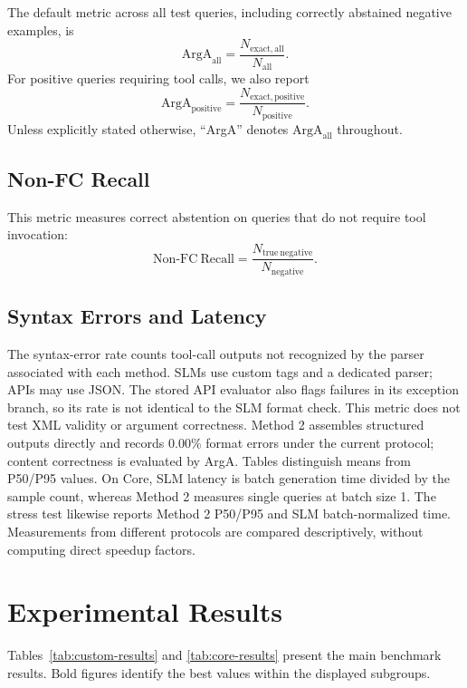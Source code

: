 \documentclass[10pt,twocolumn,a4paper]{article}
\begin{document}
The default metric across all test queries, including correctly abstained negative examples, is
\[\mathrm{ArgA}_{\mathrm{all}}=\frac{N_{\mathrm{exact,all}}}{N_{\mathrm{all}}}.\]
For positive queries requiring tool calls, we also report
\[\mathrm{ArgA}_{\mathrm{positive}}=\frac{N_{\mathrm{exact,positive}}}{N_{\mathrm{positive}}}.\]
Unless explicitly stated otherwise, ``ArgA'' denotes $\mathrm{ArgA}_{\mathrm{all}}$ throughout.

\subsection{Non-FC Recall}
This metric measures correct abstention on queries that do not require tool invocation:
\[\mathrm{Non\text{-}FC\ Recall}=\frac{N_{\mathrm{true\ negative}}}{N_{\mathrm{negative}}}.\]

\subsection{Syntax Errors and Latency}
The syntax-error rate counts tool-call outputs not recognized by the parser associated with each method. SLMs use custom tags and a dedicated parser; APIs may use JSON. The stored API evaluator also flags failures in its exception branch, so its rate is not identical to the SLM format check. This metric does not test XML validity or argument correctness. Method 2 assembles structured outputs directly and records 0.00\% format errors under the current protocol; content correctness is evaluated by ArgA. Tables distinguish means from P50/P95 values. On Core, SLM latency is batch generation time divided by the sample count, whereas Method 2 measures single queries at batch size 1. The stress test likewise reports Method 2 P50/P95 and SLM batch-normalized time. Measurements from different protocols are compared descriptively, without computing direct speedup factors.

\section{Experimental Results}
Tables~\ref{tab:custom-results} and \ref{tab:core-results} present the main benchmark results. Bold figures identify the best values within the displayed subgroups.
\end{document}
